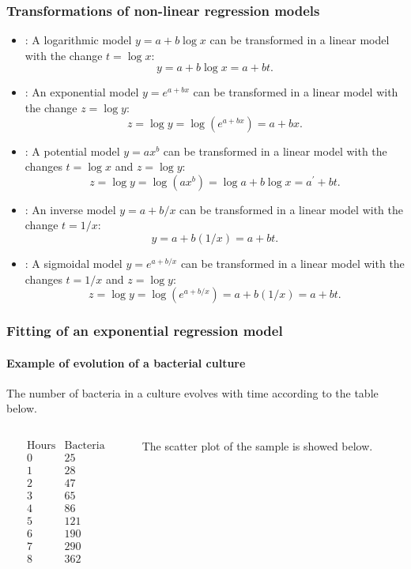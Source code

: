 \begin{frame}
\frametitle{Transformations of non-linear regression models}
\begin{itemize}
\item {}: A logarithmic model $y = a+b \log x$ can be transformed in a linear model with
the change $t=\log x$:
\[y=a+b\log x = a+bt.\]
\item {}: An exponential model $y = e^{a+bx}$ can be transformed in a linear model with the
change $z = \log y$:
\[z = \log y = \log(e^{a+bx}) =  a+bx. \]
\item {}: A potential model $y = ax^b$ can be transformed in a linear model with the changes
$t=\log x$ and $z=\log y$:
\[z = \log y = \log(ax^b) = \log a + b \log x = a^\prime+bt.\]
\item {}: An inverse model $y = a+b/x$ can be transformed in a linear model with the change $t=1/x$:
\[y = a + b(1/x) = a+bt.\]
\item {}: A sigmoidal model $y = e^{a+b/x}$ can be transformed in a linear model with the
changes $t=1/x$ and $z=\log y$:
\[z = \log y = \log (e^{a+b/x}) = a+b(1/x) = a+bt.\]
\end{itemize}
\end{frame}


\begin{frame}
\frametitle{Fitting of an exponential regression model}
\framesubtitle{Example of evolution of a bacterial culture}
The number of bacteria in a culture evolves with time according to the table below.
\begin{columns}
\begin{column}{0.3\textwidth}
\[
\begin{array}{c|c}
\mbox{Hours} & \mbox{Bacteria}\\
\hline
0 &  25 \\
1 & 28 \\
2 &  47\\
3 & 65 \\
4 & 86\\
5 & 121\\
6 & 190\\
7 & 290\\
8 & 362
\end{array}
\]
\end{column}
\begin{column}{0.6\textwidth}
The scatter plot of the sample is showed below.
\begin{center}
\resizebox{0.9\textwidth}{!}{}
\end{center}
\end{column}
\end{columns}
\end{frame}



